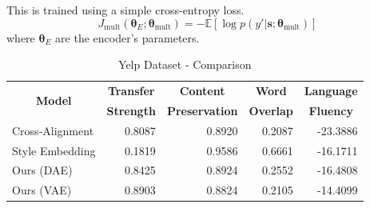 \documentclass[11pt,a4paper]{article}
\newcommand{\tabh}[1]{\multicolumn{1}{c|}{\textbf{#1}}}
\newcommand{\tabc}[2]{\multicolumn{1}{|c|}{\multirow{#1}{*}{\textbf{#2}}}}
\newcommand{\loss}[1]{J_\text{#1}}
\begin{document}
This is trained using a simple cross-entropy loss.
\begin{equation} \label{eqn:multi-task-loss}
	\loss{mult}(\bm\theta_{E};\bm\theta_\text{mult}) =
	- \mathbb{E} [\log p(y' | \bm s; \bm\theta_\text{mult})]
\end{equation}
where $\bm\theta_E$ are the encoder's parameters.


\begin{table}[ht]
	\centering
	\begin{tabular}{| l | r | r | r | r |}
		\hline
		\tabc{2}{Model}                       & \tabh{Transfer} & \tabh{Content}      & \tabh{Word}    & \tabh{Language} \\
		                                      & \tabh{Strength} & \tabh{Preservation} & \tabh{Overlap} & \tabh{Fluency}  \\
		\hline
		\hline
		Cross-Alignment \citep{shen2017style} & 0.8087          & 0.8920              & 0.2087         & -23.3886        \\
		\hline
		Style Embedding \citep{fu2017style}   & 0.1819          & 0.9586              & 0.6661         & -16.1711        \\
		\hline
		Ours (DAE)                            & 0.8425          & 0.8924              & 0.2552         & -16.4808        \\
		\hline
		Ours (VAE)                            & 0.8903          & 0.8824              & 0.2105         & -14.4099        \\
		\hline
	\end{tabular}
	\caption{Yelp Dataset - Comparison}
	\label{tab:yelp-comparison-previous}
\end{table}
\end{document}
